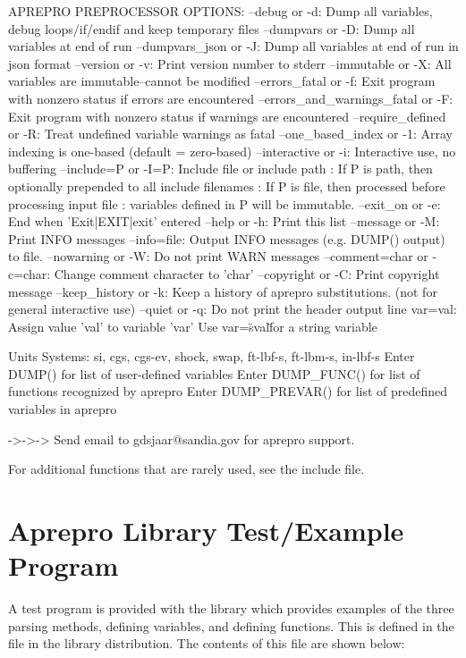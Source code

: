 \begin{apout}
APREPRO PREPROCESSOR OPTIONS:
  --debug or -d: Dump all variables, debug loops/if/endif and keep temporary files
       --dumpvars or -D: Dump all variables at end of run
  --dumpvars_json or -J: Dump all variables at end of run in json format
        --version or -v: Print version number to stderr
      --immutable or -X: All variables are immutable--cannot be modified
   --errors\_fatal or -f: Exit program with nonzero status if errors are encountered
 --errors\_and\_warnings_fatal or -F: Exit program with nonzero status if warnings are encountered
--require\_defined or -R: Treat undefined variable warnings as fatal
--one\_based\_index or -1: Array indexing is one-based (default = zero-based)
    --interactive or -i: Interactive use, no buffering
    --include=P or -I=P: Include file or include path
                       : If P is path, then optionally prepended to all include filenames
                       : If P is file, then processed before processing input file
                       : variables defined in P will be immutable.
       --exit\_on or -e: End when 'Exit|EXIT|exit' entered
           --help or -h: Print this list
        --message or -M: Print INFO messages
            --info=file: Output INFO messages (e.g. DUMP() output) to file.
      --nowarning or -W: Do not print WARN messages
--comment=char or -c=char: Change comment character to 'char'
      --copyright or -C: Print copyright message
  --keep\_history or -k: Keep a history of aprepro substitutions.
                         (not for general interactive use)
          --quiet or -q: Do not print the header output line
                var=val: Assign value 'val' to variable 'var'
                         Use var=\"sval\" for a string variable

	Units Systems: si, cgs, cgs-ev, shock, swap, ft-lbf-s, ft-lbm-s, in-lbf-s
	Enter {DUMP()} for list of user-defined variables
	Enter {DUMP_FUNC()} for list of functions recognized by aprepro
	Enter {DUMP_PREVAR()} for list of predefined variables in aprepro

	->->-> Send email to gdsjaar@sandia.gov for aprepro support.
\end{apout}

For additional functions that are rarely used, see the
 include file.

\section{Aprepro Library Test/Example Program}
A test program is provided with the \aprepro{} library which provides
examples of the three parsing methods, defining variables, and
defining functions.  This is defined in the  file in
the \aprepro{} library distribution. The contents of this file are
shown below:



